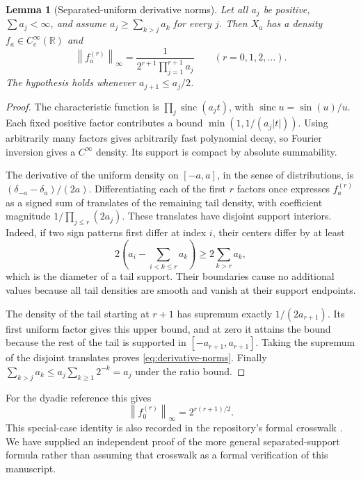 \documentclass[11pt,a4paper]{article}
\numberwithin{equation}{section}
\newtheorem{lemma}[theorem]{Lemma}
\theoremstyle{definition}
\theoremstyle{remark}
\DeclareMathOperator{\sinc}{sinc}
\newcommand{\R}{\mathbb R}
\newcommand{\norm}[1]{\left\lVert #1\right\rVert}
\begin{document}
\begin{lemma}[Separated-uniform derivative norms]
\label{lem:derivative-norms}
Let all $a_j$ be positive, $\sum a_j<\infty$, and assume
$a_j\ge\sum_{k>j}a_k$ for every $j$. Then $X_a$ has a density
$f_a\in C_c^\infty(\R)$ and
\begin{equation}
 \norm{f_a^{(r)}}_\infty
 =\frac{1}{2^{r+1}\prod_{j=1}^{r+1}a_j}
 \qquad(r=0,1,2,\ldots).
 \label{eq:derivative-norms}
\end{equation}
The hypothesis holds whenever $a_{j+1}\le a_j/2$.
\end{lemma}
\begin{proof}
The characteristic function is $\prod_j\sinc(a_jt)$, with
$\sinc u=\sin(u)/u$. Each fixed positive factor contributes a bound
$\min(1,1/(a_j|t|))$. Using arbitrarily many factors gives arbitrarily
fast polynomial decay, so Fourier inversion gives a $C^\infty$ density.
Its support is compact by absolute summability.

The derivative of the uniform density on $[-a,a]$, in the sense of
distributions, is $(\delta_{-a}-\delta_a)/(2a)$. Differentiating each of
the first $r$ factors once expresses $f_a^{(r)}$ as a signed sum of translates
of the remaining tail density, with coefficient magnitude
$1/\prod_{j\le r}(2a_j)$. These translates have disjoint support interiors.
Indeed, if two sign patterns first differ at index $i$, their centers differ
by at least
\[
 2\left(a_i-\sum_{i<k\le r}a_k\right)
 \ge2\sum_{k>r}a_k,
\]
which is the diameter of a tail support. Their boundaries cause no additional
values because all tail densities are smooth and vanish at their support
endpoints.

The density of the tail starting at $r+1$ has supremum exactly
$1/(2a_{r+1})$. Its first uniform factor gives this upper bound, and at zero
it attains the bound because the rest of the tail is supported in
$[-a_{r+1},a_{r+1}]$. Taking the supremum of the disjoint translates proves
\eqref{eq:derivative-norms}. Finally
$\sum_{k>j}a_k\le a_j\sum_{k\ge1}2^{-k}=a_j$ under the ratio bound.
\end{proof}

For the dyadic reference this gives
\begin{equation}
 \norm{f_0^{(r)}}_\infty=2^{r(r+1)/2}.
 \label{eq:reference-norm}
\end{equation}
This special-case identity is also recorded in the repository's formal
crosswalk \cite{anchored}. We have supplied an independent proof of the
more general separated-support formula rather than assuming that crosswalk
as a formal verification of this manuscript.
\end{document}
